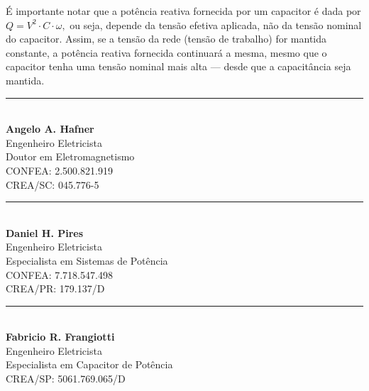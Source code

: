 \documentclass[a4paper]{article}
\begin{document}
É importante notar que a potência reativa fornecida por um capacitor é dada por $Q = V^2 \cdot C \cdot \omega,$ ou seja, depende da tensão efetiva aplicada, não da tensão nominal do capacitor. Assim, se a tensão da rede (tensão de trabalho) for mantida constante, a potência reativa fornecida continuará a mesma, mesmo que o capacitor tenha uma tensão nominal mais alta — desde que a capacitância seja mantida.
  



\printbibliography







\noindent %
\begin{minipage}[t]{0.3\textwidth}
	\centering
	\vspace{4cm}
	\rule{5cm}{0.4pt}\\
	{\linespread{0.9}\selectfont %
		\textbf{Angelo A. Hafner}\\
		\small
		Engenheiro Eletricista\\ Doutor em Eletromagnetismo\\
		CONFEA: 2.500.821.919\\
		CREA/SC: 045.776-5\\
	}
\end{minipage}
\hfill %
\begin{minipage}[t]{0.3\textwidth}
	\centering
	\vspace{4cm}
	\rule{5cm}{0.4pt}\\
	{\linespread{0.9}\selectfont %
		\textbf{Daniel H. Pires}\\
		\small
		Engenheiro Eletricista\\ Especialista em Sistemas de Potência\\
		CONFEA: 7.718.547.498\\
		CREA/PR: 179.137/D\\
	}
\end{minipage}
\hfill %
\begin{minipage}[t]{0.3\textwidth}
	\centering
	\vspace{4cm}
	\rule{5cm}{0.4pt}\\
	{\linespread{0.9}\selectfont %
		\textbf{Fabricio R. Frangiotti}\\
		\small
		Engenheiro Eletricista\\ Especialista em Capacitor de Potência\\
		CREA/SP: 5061.769.065/D\\
	}
\end{minipage}
\end{document}
